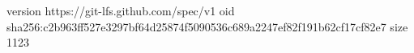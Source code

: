 version https://git-lfs.github.com/spec/v1
oid sha256:c2b963ff527e3297bf64d25874f5090536c689a2247ef82f191b62cf17cf82e7
size 1123
